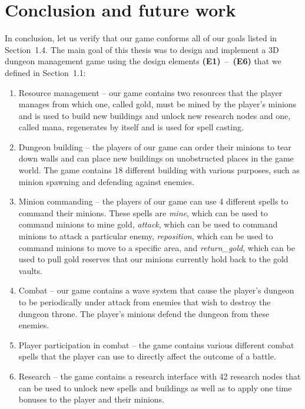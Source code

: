 \chapter*{Conclusion and future work}

In conclusion, let us verify that  our game conforms all of our goals listed in Section~1.4. The main goal of this thesis was to design
and implement a 3D dungeon management game using the design elements \textbf{(E1)}~--~\textbf{(E6)} that we defined in Section~1.1:

\begin{enumerate}[label=\textbf{(E\arabic*)}]
    \item Resource management -- our game contains two resources that the player manages from which one, called gold, must be mined by
        the player's minions and is used to build new buildings and unlock new research nodes and one, called mana, regenerates by
        itself and is used for spell casting.
    \item Dungeon building -- the players of our game can order their minions to tear down walls and can place new buildings on
        unobstructed places in the game world. The game contains 18 different building with various purposes, such as minion
        spawning and defending against enemies.
    \item Minion commanding -- the players of our game can use 4 different spells to command their minions. These spells are
        \emph{mine}, which can be used to command minions to mine gold, \emph{attack}, which can be used to command minions to attack
        a particular enemy, \emph{reposition}, which can be used to command minions to move to a specific area, and \emph{return\_gold},
        which can be used to pull gold reserves that our minions currently hold back to the gold vaults.
    \item Combat -- our game contains a wave system that cause the player's dungeon to be periodically under attack from enemies that wish
        to destroy the dungeon throne. The player's minions defend the dungeon from these enemies.
    \item Player participation in combat -- the game contains various different combat spells that the player can use to directly affect
        the outcome of a battle.
    \item Research -- the game contains a research interface with 42 research nodes that can be used to unlock new spells and buildings as
        well as to apply one time bonuses to the player and their minions.
\end{enumerate}

